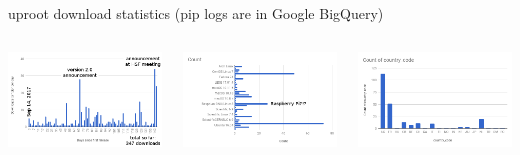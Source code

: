 \documentclass[aspectratio=169]{beamer}
\begin{document}
\begin{frame}{uproot download statistics (pip logs are in Google BigQuery)}
\vspace{0.25 cm}
\begin{columns}
\includegraphics[width=\linewidth]{downloads-per-day.png}

\includegraphics[width=\linewidth]{downloads-by-os.png}

\includegraphics[width=\linewidth]{downloads-by-country.png}


\end{columns}
\end{frame}
\end{document}
